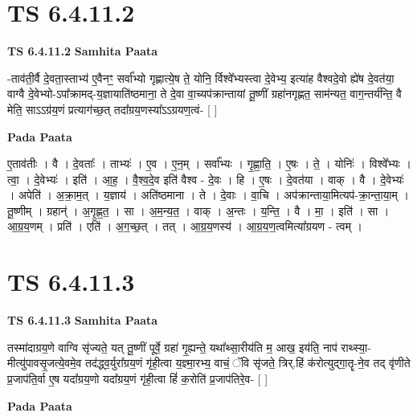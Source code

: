 \documentclass[17pt]{extarticle}
\begin{document}
\section*{ TS 6.4.11.2 }

\textbf{TS 6.4.11.2 } \newline
\textbf{Samhita Paata} \newline

-ताव॑ती॒र्वै दे॒वता॒स्ताभ्य॑ ए॒वैनꣳ॒॒ सर्वा᳚भ्यो गृह्णात्ये॒ष ते॒ योनि॒ र्विश्वे᳚भ्यस्त्वा दे॒वेभ्य॒ इत्या॑ह वैश्वदे॒वो ह्ये॑ष दे॒वत॑या॒ वाग्वै दे॒वेभ्यो-ऽपा᳚क्रामद्-य॒ज्ञायाति॑ष्ठमाना॒ ते दे॒वा वा॒च्यप॑क्रान्तायां तू॒ष्णीं ग्रहा॑नगृह्णत॒ साम॑न्यत॒ वाग॒न्तर्य॑न्ति॒ वै मेति॒ साऽऽग्र॑य॒णं प्रत्याग॑च्छ॒त् तदा᳚ग्रय॒णस्या᳚ऽऽग्रयण॒त्वं- [  ] \newline

\textbf{Pada Paata} \newline

ए॒ताव॑तीः । वै । दे॒वताः᳚ । ताभ्यः॑ । ए॒व । ए॒न॒म् । सर्वा᳚भ्यः । गृ॒ह्णा॒ति॒ । ए॒षः । ते॒ । योनिः॑ । विश्वे᳚भ्यः । त्वा॒ । दे॒वेभ्यः॑ । इति॑ । आ॒ह॒ । वै॒श्व॒दे॒व इति॑ वैश्व - दे॒वः । हि । ए॒षः । दे॒वत॑या । वाक् । वै । दे॒वेभ्यः॑ । अपेति॑ । अ॒क्रा॒म॒त् । य॒ज्ञाय॑ । अति॑ष्ठमाना । ते । दे॒वाः । वा॒चि । अप॑क्रान्ताया॒मित्यप॑-क्रा॒न्ता॒या॒म् । तू॒ष्णीम् । ग्रहान्॑ । अ॒गृ॒ह्ण॒त॒ । सा । अ॒म॒न्य॒त॒ । वाक् । अ॒न्तः । य॒न्ति॒ । वै । मा॒ । इति॑ । सा । आ॒ग्र॒य॒णम् । प्रति॑ । एति॑ । अ॒ग॒च्छ॒त् । तत् । आ॒ग्र॒य॒णस्य॑ । आ॒ग्र॒य॒ण॒त्वमित्या᳚ग्रयण - त्वम् ।  \newline




\section*{ TS 6.4.11.3 }

\textbf{TS 6.4.11.3 } \newline
\textbf{Samhita Paata} \newline

तस्मा॑दाग्रय॒णे वाग्वि सृ॑ज्यते॒ यत् तू॒ष्णीं पूर्वे॒ ग्रहा॑ गृ॒ह्यन्ते॒ यथा᳚थ्सा॒रीय॑ति म॒ आख॒ इय॑ति॒ नाप॑ राथ्स्या॒-मीत्यु॑पावसृ॒जत्ये॒वमे॒व तद॑द्ध्व॒र्युरा᳚ग्रय॒णं गृ॑ही॒त्वा य॒ज्ञ्मा॒रभ्य॒ वाचं॒ ॅवि सृ॑जते॒ त्रिर्.हिं क॑रोत्युद्गा॒तॄ-ने॒व तद् वृ॑णीते प्र॒जाप॑ति॒र्वा ए॒ष यदा᳚ग्रय॒णो यदा᳚ग्रय॒णं गृ॑ही॒त्वा हिं॑ क॒रोति॑ प्र॒जाप॑तिरे॒व- [  ] \newline

\textbf{Pada Paata} \newline
\end{document}
